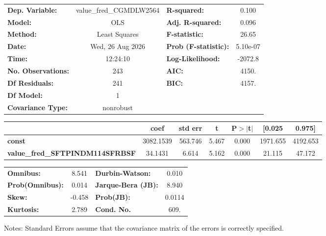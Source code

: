 \begin{center}
\begin{tabular}{lclc}
\toprule
\textbf{Dep. Variable:}                 & value\_fred\_CGMDLW2564 & \textbf{  R-squared:         } &     0.100   \\
\textbf{Model:}                         &           OLS           & \textbf{  Adj. R-squared:    } &     0.096   \\
\textbf{Method:}                        &      Least Squares      & \textbf{  F-statistic:       } &     26.65   \\
\textbf{Date:}                          &     Wed, 26 Aug 2026    & \textbf{  Prob (F-statistic):} &  5.10e-07   \\
\textbf{Time:}                          &         12:24:10        & \textbf{  Log-Likelihood:    } &   -2072.8   \\
\textbf{No. Observations:}              &             243         & \textbf{  AIC:               } &     4150.   \\
\textbf{Df Residuals:}                  &             241         & \textbf{  BIC:               } &     4157.   \\
\textbf{Df Model:}                      &               1         & \textbf{                     } &             \\
\textbf{Covariance Type:}               &        nonrobust        & \textbf{                     } &             \\
\bottomrule
\end{tabular}
\begin{tabular}{lcccccc}
                                        & \textbf{coef} & \textbf{std err} & \textbf{t} & \textbf{P$> |$t$|$} & \textbf{[0.025} & \textbf{0.975]}  \\
\midrule
\textbf{const}                          &    3082.1539  &      563.746     &     5.467  &         0.000        &     1971.655    &     4192.653     \\
\textbf{value\_fred\_SFTPINDM114SFRBSF} &      34.1431  &        6.614     &     5.162  &         0.000        &       21.115    &       47.172     \\
\bottomrule
\end{tabular}
\begin{tabular}{lclc}
\textbf{Omnibus:}       &  8.541 & \textbf{  Durbin-Watson:     } &    0.010  \\
\textbf{Prob(Omnibus):} &  0.014 & \textbf{  Jarque-Bera (JB):  } &    8.940  \\
\textbf{Skew:}          & -0.458 & \textbf{  Prob(JB):          } &   0.0114  \\
\textbf{Kurtosis:}      &  2.789 & \textbf{  Cond. No.          } &     609.  \\
\bottomrule
\end{tabular}
\end{center}

Notes: \newline
 [1] Standard Errors assume that the covariance matrix of the errors is correctly specified.